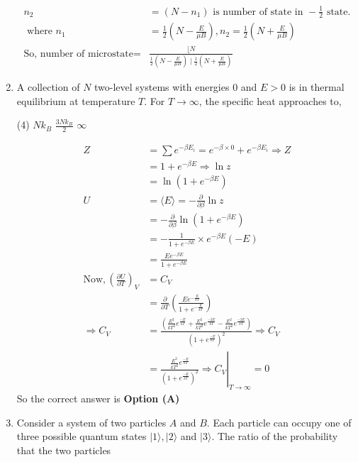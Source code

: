 \begin{enumerate}
\begin{answer}
\begin{align*}
n_{2}&=\left(N-n_{1}\right)\text{ is number of state in }-\frac{1}{2}\text{ state.}\\
\text{	where }n_{1}&=\frac{1}{2}\left(N-\frac{E}{\mu B}\right), n_{2}=\frac{1}{2}\left(N+\frac{E}{\mu B}\right)\\
\text{So, number of microstate}=&\frac{\lfloor N}{\frac{1}{2}\left(N-\frac{E}{\mu B}\right) \mid \frac{1}{2}\left(N+\frac{E}{\mu B}\right)}
\end{align*}
\end{answer}
	\item A collection of $N$ two-level systems with energies 0 and $E>0$ is in thermal
	equilibrium at temperature $T$. For $T \rightarrow \infty$, the specific heat approaches to,
{	}
\begin{tasks}(4)
\task[\textbf{B.}] $N k_{B}$
\task[\textbf{C.}] $\frac{3 N k_{B}}{2}$
\task[\textbf{D.}] $\infty$
\end{tasks}
\begin{answer}
\begin{align*}
Z&=\sum e^{-\beta E_{i}}=e^{-\beta \times 0}+e^{-\beta E_{i}} \Rightarrow Z\\&=1+e^{-\beta E} \Rightarrow \ln z\\&=\ln \left(1+e^{-\beta E}\right)\\
U&=\langle E\rangle=-\frac{\partial}{\partial \beta} \ln z\\&=-\frac{\partial}{\partial \beta} \ln \left(1+e^{-\beta E}\right)\\&=-\frac{1}{1+e^{-\beta E}} \times e^{-\beta E}(-E)\\&=\frac{E e^{-\beta E}}{1+e^{-\beta E}}\\
\text{Now},\left(\frac{\partial U}{\partial T}\right)_{V}&=C_{V}\\
&=\frac{\partial}{\partial T}\left(\frac{E e^{-\frac{E}{k T}}}{1+e^{-\frac{E}{k T}}}\right)\\
\Rightarrow C_{V}&=\frac{\left(\frac{E^{2}}{k T^{2}} e^{\frac{-E}{k T}}+\frac{E^{2}}{k T^{2}} e^{\frac{-2 E}{k T}}-\frac{E^{2}}{k T^{2}} e^{\frac{-2 E}{k T}}\right)}{\left(1+e^{\frac{-E}{k T}}\right)^{2}} \Rightarrow C_{V}\\
&=\left.\frac{\frac{E^{2}}{k T^{2}} e^{\frac{-E}{k T}}}{\left(1+e^{\frac{-E}{k T}}\right)^{2}} \Rightarrow C_{V}\right|_{T \rightarrow \infty}=0
\end{align*}
So the correct answer is \textbf{Option (A)}
\end{answer}
\item 	Consider a system of two particles $A$ and $B$. Each particle can occupy one of three possible quantum states $|1\rangle,|2\rangle$ and $|3\rangle$. The ratio of the probability that the two particles

\end{enumerate}
